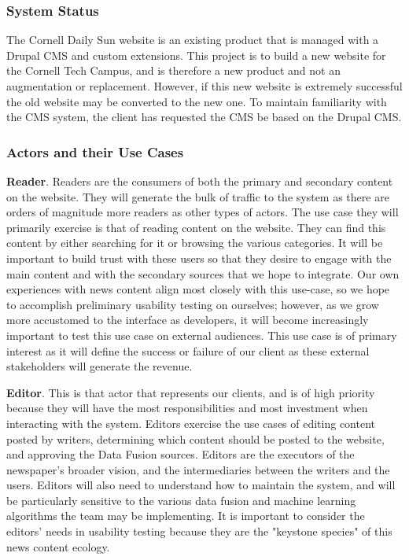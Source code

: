 \documentclass[11pt]{article} %
\begin{document}
\subsubsection{System Status}
                   
The Cornell Daily Sun website is an existing product that is managed with a Drupal CMS and custom extensions. This project is to build a new website for the Cornell Tech Campus, and is therefore a new product and not an augmentation or replacement. However, if this new website is extremely successful the old website may be converted to the new one. To maintain familiarity with the CMS system, the client has requested the CMS be based on the Drupal CMS.

\subsubsection{Actors and their Use Cases}

\textbf{Reader}. Readers are the consumers of both the primary and secondary content on the website. They will generate the bulk of traffic to the system as there are orders of magnitude more readers as other types of actors. The use case they will primarily exercise is that of reading content on the website. They can find this content by either searching for it or browsing the various categories. It will be important to build trust with these users so that they desire to engage with the main content and with the secondary sources that we hope to integrate. Our own experiences with news content align most closely with this use-case, so we hope to accomplish preliminary usability testing on ourselves; however, as we grow more accustomed to the interface as developers, it will become increasingly important to test this use case on external audiences. This use case is of primary interest as it will define the success or failure of our client as these external stakeholders will generate the revenue.

\textbf{Editor}. This is that actor that represents our clients, and is of high priority because they will have the most responsibilities and most investment when interacting with the system. Editors exercise the use cases of editing content posted by writers, determining which content should be posted to the website, and approving the Data Fusion sources. Editors are the executors of the newspaper’s broader vision, and the intermediaries between the writers and the users. Editors will also need to understand how to maintain the system, and will be particularly sensitive to the various data fusion and machine learning algorithms the team may be implementing. It is important to consider the editors' needs in usability testing because they are the "keystone species" of this news content ecology.
\end{document}
